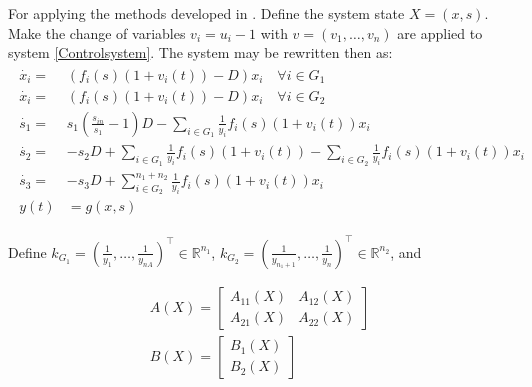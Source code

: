 \documentclass[3p,times]{elsarticle}
\newcommand{\R}{\mathbb{R}}
\begin{document}
For applying the methods developed in \cite{Cimen2004}. Define the system state $X = (x,s)$. Make the change of variables $v_i = u_i - 1$ with $v = (v_1,\dots,v_n)$ are applied to system \eqref{Controlsystem}. The system may be rewritten then as:
\begin{align} 
\begin{array}{cl}
\dot{x_i} =& \left(f_i(s)(1+v_i(t)) -D \right)x_i \quad \forall i \in G_1\\
\dot{x_i} =& \left(f_i(s)(1+v_i(t)) -D \right)x_i \quad \forall i \in G_2\\
\dot{s_1} =& \displaystyle s_1\left(\frac{s_{in}}{s_1}-1\right)D-\sum\limits_{i \in G_1}\frac{1}{y_i}f_i(s)(1+v_i(t)) x_i  \\
\dot{s_2} = & \displaystyle -s_2D+\sum\limits_{i \in G_1}\frac{1}{y_i}f_i(s)(1+v_i(t))	-\sum\limits_{i \in G_2}\frac{1}{y_i}f_i(s)(1+v_i(t)) x_i  \\
\dot{s_3} =&  \displaystyle -s_3D+\sum\limits_{i \in G_2}^{n_1+n_2}\frac{1}{y_i}f_i(s)(1+v_i(t)) x_i \\
y(t) & = g(x,s)
\end{array}
\end{align}	

Define $k_{G_1} = \left ( \frac{1}{y_1},\dots,\frac{1}{y_{nA}}\right )^\top \in \R^{n_1}$,  $k_{G_2} = \left(\frac{1}{y_{n_1+1}},\dots,\frac{1}{y_{n}}\right )^\top \in \R^{n_2}$, and

\begin{align}
\label{A_matrix} A\left (X\right) = \begin{bmatrix}
A_{11}(X) & A_{12}(X) \\ A_{21}(X) & A_{22}(X)
\end{bmatrix} \\
\label{B_matrix} B\left (X\right) = \begin{bmatrix}
B_1(X) \\ B_2(X)
\end{bmatrix} 
\end{align}
\end{document}
